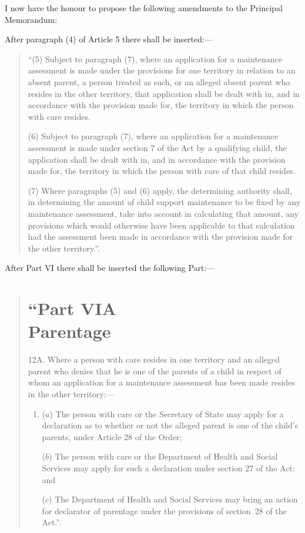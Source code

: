 \documentclass[12pt,a4paper]{article}
\begin{document}
  I now have the honour to propose the following amendments to the Principal Memorandum:

  After paragraph (4) of Article 5 there shall be inserted:—
\begin{quotation}
 “(5) Subject to paragraph (7), where an application for a maintenance assessment is made under the provisions for one territory in relation to an absent parent, a person treated as such, or an alleged absent parent who resides in the other territory, that application shall be dealt with in, and in accordance with the provision made for, the territory in which the person with care resides.

(6) Subject to paragraph (7), where an application for a maintenance assessment is made under section 7 of the Act by a qualifying child, the application shall be dealt with in, and in accordance with the provision made for, the territory in which the person with care of that child resides.

(7) Where paragraphs (5) and (6) apply, the determining authority shall, in determining the amount of child support maintenance to be fixed by any maintenance assessment, take into account in calculating that amount, any provisions which would otherwise have been applicable to that calculation had the assessment been made in accordance with the provision made for the other territory.”.
\end{quotation}

  After Part VI there shall be inserted the following Part:—
\begin{quotation}
 \section*{“Part VIA\\Parentage}

12A.  Where a person with care resides in one territory and an alleged parent who denies that he is one of the parents of a child in respect of whom an application for a maintenance assessment has been made resides in the other territory:—
\begin{enumerate}\item[]
($a$) The person with care or the Secretary of State may apply for a declaration as to whether or not the alleged parent is one of the child’s parents, under Article 28 of the Order;

($b$) The person with care or the Department of Health and Social Services may apply for such a declaration under section 27 of the Act; and

($c$) The Department of Health and Social Services may bring an action for declarator of parentage under the provisions of section~28 of the Act.”.
\end{enumerate}
\end{quotation}
\end{document}
